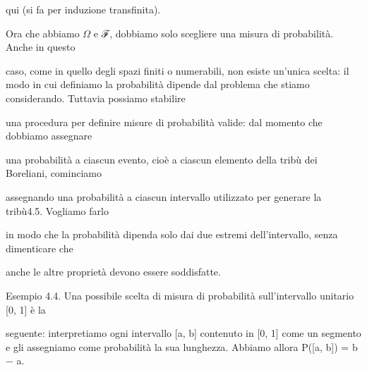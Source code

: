 \documentclass[a4paper,portrait,12pt]{article}
\begin{document}
\begin{flushleft}
qui (si fa per induzione transfinita).
\end{flushleft}


\begin{flushleft}
Ora che abbiamo $\Omega$ e ℱ, dobbiamo solo scegliere una misura di probabilit\`{a}. Anche in questo
\end{flushleft}


\begin{flushleft}
caso, come in quello degli spazi finiti o numerabili, non esiste un'unica scelta: il modo in cui definiamo la probabilit\`{a} dipende dal problema che stiamo considerando. Tuttavia possiamo stabilire
\end{flushleft}


\begin{flushleft}
una procedura per definire misure di probabilit\`{a} valide: dal momento che dobbiamo assegnare
\end{flushleft}


\begin{flushleft}
una probabilit\`{a} a ciascun evento, cio\`{e} a ciascun elemento della tribù dei Boreliani, cominciamo
\end{flushleft}


\begin{flushleft}
assegnando una probabilit\`{a} a ciascun intervallo utilizzato per generare la tribù4.5. Vogliamo farlo
\end{flushleft}


\begin{flushleft}
in modo che la probabilit\`{a} dipenda solo dai due estremi dell'intervallo, senza dimenticare che
\end{flushleft}


\begin{flushleft}
anche le altre propriet\`{a} devono essere soddisfatte.
\end{flushleft}





\begin{flushleft}
Esempio 4.4. Una possibile scelta di misura di probabilit\`{a} sull'intervallo unitario [0, 1] \`{e} la
\end{flushleft}


\begin{flushleft}
seguente: interpretiamo ogni intervallo [a, b] contenuto in [0, 1] come un segmento e gli assegniamo come probabilit\`{a} la sua lunghezza. Abbiamo allora P([a, b]) = b $-$ a.
\end{flushleft}
\end{document}
